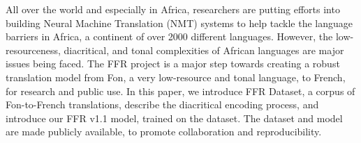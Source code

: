 All over the world and especially in Africa, researchers are putting efforts into building Neural Machine Translation (NMT) systems to help tackle the language barriers in Africa, a continent of over 2000 different languages. However, the low-resourceness, diacritical, and tonal complexities of African languages are major issues being faced. The FFR project is a major step towards creating a robust translation model from Fon, a very low-resource and tonal language, to French, for research and public use. In this paper, we introduce FFR Dataset, a corpus of Fon-to-French translations, describe the diacritical encoding process, and introduce our FFR v1.1 model, trained on the dataset. The dataset and model are made publicly available, to promote collaboration and reproducibility.
